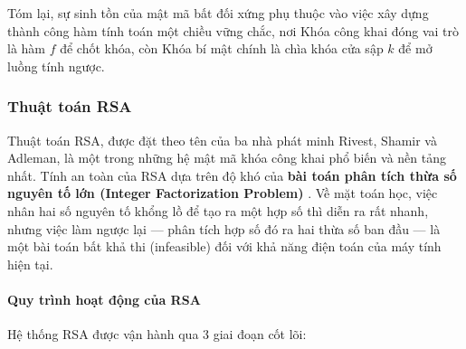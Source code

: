 Tóm lại, sự sinh tồn của mật mã bất đối xứng phụ thuộc vào việc xây dựng thành công hàm tính toán một chiều vững chắc, nơi Khóa công khai đóng vai trò là hàm $f$ để chốt khóa, còn Khóa bí mật chính là chìa khóa cửa sập $k$ để mở luồng tính ngược.

\subsubsection*{Thuật toán RSA}

Thuật toán RSA, được đặt theo tên của ba nhà phát minh Rivest, Shamir và Adleman, là một trong những hệ mật mã khóa công khai phổ biến và nền tảng nhất. Tính an toàn của RSA dựa trên độ khó của \textbf{bài toán phân tích thừa số nguyên tố lớn (Integer Factorization Problem)} \cite{Rivest1978}. Về mặt toán học, việc nhân hai số nguyên tố khổng lồ để tạo ra một hợp số thì diễn ra rất nhanh, nhưng việc làm ngược lại — phân tích hợp số đó ra hai thừa số ban đầu — là một bài toán bất khả thi (infeasible) đối với khả năng điện toán của máy tính hiện tại.

\paragraph*{Quy trình hoạt động của RSA}
Hệ thống RSA được vận hành qua 3 giai đoạn cốt lõi:

